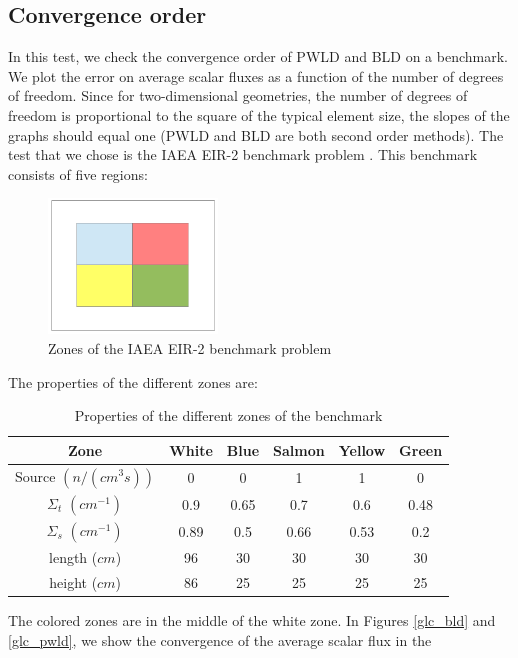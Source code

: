 \subsection{Convergence order}
In this test, we check the convergence order of PWLD and BLD on a benchmark.
We plot the error on average scalar fluxes as a function of the number of 
degrees of freedom. Since for two-dimensional geometries, the number of
degrees of freedom is
proportional to the square of the typical element size, the slopes of the 
graphs should equal one (PWLD and BLD are both second order methods). The test
that we chose is the IAEA EIR-2 benchmark problem \cite{Khalil1985}. This 
benchmark consists of five regions:
\begin{figure}[H]
  \centering
  \includegraphics[width=0.4\textwidth]{./Janus/benchmark}
  \caption{Zones of the IAEA EIR-2 benchmark problem}
\end{figure}
The properties of the different zones are:
\begin{table}[H]
  \begin{center}
    \caption{Properties of the different zones of the benchmark}
    \begin{tabular}{|c|c|c|c|c|c|}
      \hline
    Zone & White & Blue & Salmon & Yellow & Green \\
      \hline
      Source $(n/(cm^3s))$ & 0    & 0    & 1    & 1    & 0 \\
    $\Sigma_t$ $(cm^{-1})$ & 0.9  & 0.65 & 0.7  & 0.6  & 0.48 \\
    $\Sigma_s$ $(cm^{-1})$ & 0.89 & 0.5  & 0.66 & 0.53 & 0.2 \\
             length ($cm$) & 96   & 30   & 30   & 30   & 30 \\
             height ($cm$) & 86   & 25   & 25   & 25   & 25 \\
      \hline
    \end{tabular}
  \end{center}
\end{table}
The colored zones are in the middle of the white zone. In Figures \ref{glc_bld} 
and \ref{glc_pwld}, we show the convergence of the average scalar flux in the
